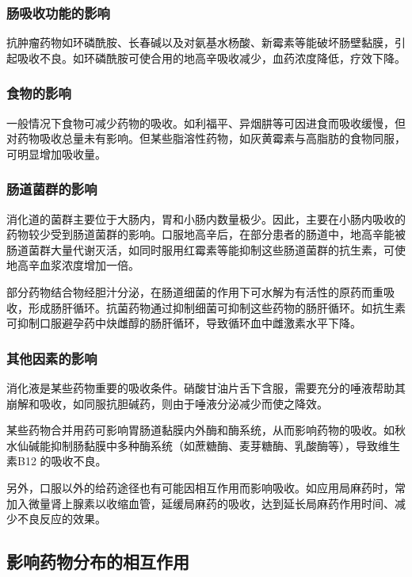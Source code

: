 \subsubsection{肠吸收功能的影响}

抗肿瘤药物如环磷酰胺、长春碱以及对氨基水杨酸、新霉素等能破坏肠壁黏膜，引起吸收不良。如环磷酰胺可使合用的地高辛吸收减少，血药浓度降低，疗效下降。

\subsubsection{食物的影响}

一般情况下食物可减少药物的吸收。如利福平、异烟肼等可因进食而吸收缓慢，但对药物吸收总量未有影响。但某些脂溶性药物，如灰黄霉素与高脂肪的食物同服，可明显增加吸收量。

\subsubsection{肠道菌群的影响}

消化道的菌群主要位于大肠内，胃和小肠内数量极少。因此，主要在小肠内吸收的药物较少受到肠道菌群的影响。口服地高辛后，在部分患者的肠道中，地高辛能被肠道菌群大量代谢灭活，如同时服用红霉素等能抑制这些肠道菌群的抗生素，可使地高辛血浆浓度增加一倍。

部分药物结合物经胆汁分泌，在肠道细菌的作用下可水解为有活性的原药而重吸收，形成肠肝循环。抗菌药物通过抑制细菌可抑制这些药物的肠肝循环。如抗生素可抑制口服避孕药中炔雌醇的肠肝循环，导致循环血中雌激素水平下降。

\subsubsection{其他因素的影响}

消化液是某些药物重要的吸收条件。硝酸甘油片舌下含服，需要充分的唾液帮助其崩解和吸收，如同服抗胆碱药，则由于唾液分泌减少而使之降效。

某些药物合并用药可影响胃肠道黏膜内外酶和酶系统，从而影响药物的吸收。如秋水仙碱能抑制肠黏膜中多种酶系统（如蔗糖酶、麦芽糖酶、乳酸酶等），导致维生素B{12}
的吸收不良。

另外，口服以外的给药途径也有可能因相互作用而影响吸收。如应用局麻药时，常加入微量肾上腺素以收缩血管，延缓局麻药的吸收，达到延长局麻药作用时间、减少不良反应的效果。

\subsection{影响药物分布的相互作用}

